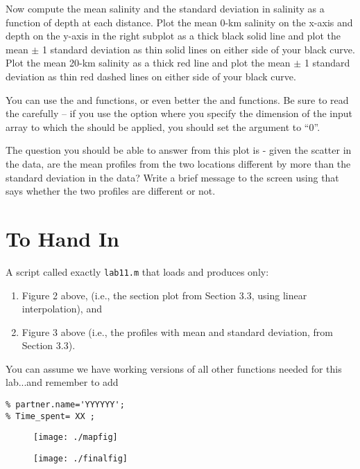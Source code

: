 \documentclass[letterpaper]{article}
\begin{document}
Now compute the mean salinity and the standard deviation in salinity as a function of depth at each distance.  
Plot the mean 0-km salinity on the x-axis and depth on the y-axis in the right subplot as a thick black solid line and plot the mean $\pm$ 1 standard deviation as thin solid lines on either side of your black curve.
Plot the mean 20-km salinity as a thick red line and plot the mean $\pm$ 1 standard deviation as thin red dashed lines on either side of your black curve.

You can use the  and  functions, or even better the  and  functions.  Be sure to read the  carefully -- if you use the option where you specify the dimension of the input array to which the  should be applied, you should set the  argument to ``0''.

The question you should be able to answer from this plot is - given the scatter in the data, are the mean
profiles from the two locations different by more than the standard deviation in the data? Write a brief message to the screen using  that says whether the two profiles are different or not.

\newpage

\section{To Hand In}

A script called exactly \verb:lab11.m: that loads  and produces only:
\begin{enumerate}
\item Figure 2 above, (i.e., the section plot from Section 3.3, using linear interpolation), and
\item Figure 3 above (i.e., the profiles with mean and standard deviation, from Section 3.3).
\end{enumerate}

You can assume we have working versions of all other functions needed for this lab...and remember to add
\begin{lstlisting}
% partner.name='YYYYYY';
% Time_spent= XX ;
\end{lstlisting}

\vspace{.3in}


\begin{figure}[h] 
\begin{center}
\texttt{[image: ./mapfig]}
\end{center}
\end{figure}

 
\begin{figure}[h] 
\begin{center}
\texttt{[image: ./finalfig]}
\end{center}
\end{figure}
\end{document}
